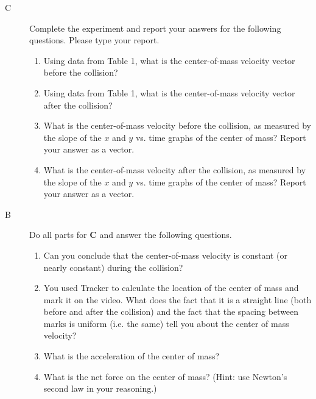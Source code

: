 \report


\begin{description}

\item[C]  Complete the experiment and report your answers for the following questions. Please type your report.

\begin{enumerate}
	 \item Using data from Table 1, what is the center-of-mass velocity vector before the collision?
	 \item Using data from Table 1, what is the center-of-mass velocity vector after the collision?
	 \item What is the center-of-mass velocity before the collision, as measured by the slope of the $x$ and $y$ vs. time graphs of the center of mass? Report your answer as a vector.
	 \item What is the center-of-mass velocity after the collision, as measured by the slope of the $x$ and $y$ vs. time graphs of the center of mass? Report your answer as a vector.
\end{enumerate}

\item[B] Do all parts for {\bf C} and answer the following questions.

\begin{enumerate}
	\item Can you conclude that the center-of-mass velocity is constant (or nearly constant) during the collision?
	\item You used Tracker to calculate the location of the center of mass and mark it on the video.  What does the fact that it is a straight line (both before and after the collision) and the fact that the spacing between marks is uniform (i.e. the same) tell you about the center of mass velocity?
	\item What is the acceleration of the center of mass?
	\item What is the net force on the center of mass?  (Hint: use Newton's second law in your reasoning.)
\end{enumerate}


\end{description}
